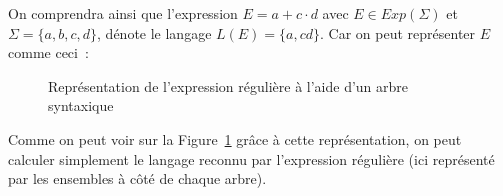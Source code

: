 \begin{example}
    On comprendra ainsi que l'expression \(E = a+c \cdot d\) avec \(E \in
    Exp(\Sigma)\) et \(\Sigma = \{a, b, c, d\}\), dénote le langage
    \(L(E) = \{a, cd\}\). Car on peut représenter \(E\) comme ceci~:

    \begin{figure}[H]
        \centering
        \captionsetup{type=figure,justification=centering}
        \caption{
            Représentation de l'expression régulière à l'aide d'un arbre syntaxique
        }\label{fig:arbre_syn}
    \end{figure}

    Comme on peut voir sur la Figure~\ref{fig:arbre_syn} grâce à cette
    représentation, on peut calculer simplement le langage reconnu par l'expression
    régulière (ici représenté par les ensembles à c\^{o}té de chaque arbre).
\end{example}

\vphantom{}

